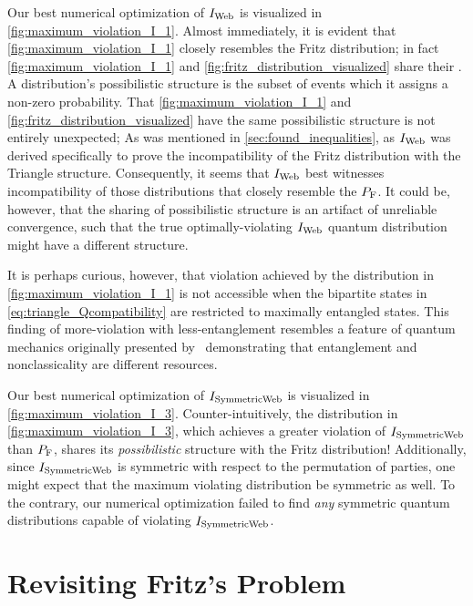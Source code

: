 \documentclass[aps, 10pt, english, twoside, pra, nofootinbib, tightenlines, longbibliography, superscriptaddress]{revtex4-1}
\begin{document}
    Our best numerical optimization of $I_\text{Web}$ is visualized in \cref{fig:maximum_violation_I_1}. Almost immediately, it is evident that \cref{fig:maximum_violation_I_1} closely resembles the Fritz distribution; in fact \cref{fig:maximum_violation_I_1} and \cref{fig:fritz_distribution_visualized} share their . A distribution's possibilistic structure is the subset of events which it assigns a non-zero probability. That \cref{fig:maximum_violation_I_1} and \cref{fig:fritz_distribution_visualized} have the same possibilistic structure is not entirely unexpected;  As was mentioned in \cref{sec:found_inequalities}, as $I_\text{Web}$ was derived specifically to prove the incompatibility of the Fritz distribution with the Triangle structure. Consequently, it seems that $I_\text{Web}$ best witnesses incompatibility of those distributions that closely resemble the $\prob[\fritz]$. It could be, however, that the sharing of possibilistic structure is an artifact of unreliable convergence, such that the true optimally-violating $I_\text{Web}$ quantum distribution might have a different structure.

    It is perhaps curious, however, that violation achieved by the distribution in \cref{fig:maximum_violation_I_1} is not accessible when the bipartite states in \cref{eq:triangle_Qcompatibility} are restricted to maximally entangled states. This finding of more-violation with less-entanglement resembles a feature of quantum mechanics originally presented by~\citet{Methot_2006} demonstrating that entanglement and nonclassicality are different resources.

    Our best numerical optimization of $I_\text{SymmetricWeb}$ is visualized in \cref{fig:maximum_violation_I_3}. Counter-intuitively, the distribution in \cref{fig:maximum_violation_I_3}, which achieves a greater violation of $I_\text{SymmetricWeb}$ than $\prob[\fritz]$, shares its \textit{possibilistic} structure with the Fritz distribution! Additionally, since $I_\text{SymmetricWeb}$ is symmetric with respect to the permutation of parties, one might expect that the maximum violating distribution be symmetric as well. To the contrary, our numerical optimization failed to find \emph{any} symmetric quantum distributions capable of violating $I_\text{SymmetricWeb}$.

    \section{Revisiting Fritz's Problem}
    \label{sec:fritz_problem_revisit}
\end{document}
